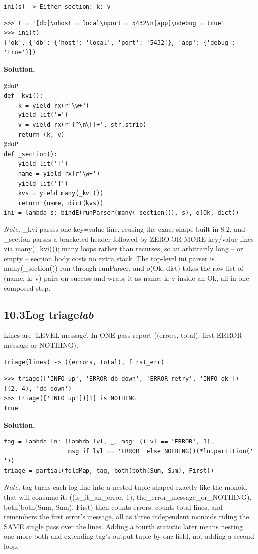 \documentclass[10pt,letterpaper]{book}
\begin{document}
\noindent\texttt{ini(s) -> Either {section: {k: v}}}
\begin{lstlisting}[style=ex]
>>> t = '[db]\nhost = local\nport = 5432\n[app]\ndebug = true'
>>> ini(t)
('ok', {'db': {'host': 'local', 'port': '5432'}, 'app': {'debug': 'true'}})
\end{lstlisting}
\noindent\textbf{Solution.}
\begin{lstlisting}[style=code]
@doP
def _kvi():
    k = yield rx(r'\w+')
    yield lit('=')
    v = yield rx(r'[^\n\[]+', str.strip)
    return (k, v)
@doP
def _section():
    yield lit('[')
    name = yield rx(r'\w+')
    yield lit(']')
    kvs = yield many(_kvi())
    return (name, dict(kvs))
ini = lambda s: bindE(runParser(many(_section()), s), o(Ok, dict))
\end{lstlisting}
\noindent\textit{Note.} \_kvi parses one key=value line, reusing the exact shape built in 8.2, and \_section parses a bracketed header followed by ZERO OR MORE key/value lines via many(\_kvi()); many loops rather than recurses, so an arbitrarily long -- or empty -- section body costs no extra stack. The top-level ini parser is many(\_section()) run through runParser, and o(Ok, dict) takes the raw list of (name, {k: v}) pairs on success and wraps it as {name: {k: v}} inside an Ok, all in one composed step.

\subsection*{10.3\quad Log triage\hfill\textnormal{\textit{lab}}}
Lines are 'LEVEL message'. In ONE pass report ((errors, total), first ERROR message or NOTHING).

\noindent\texttt{triage(lines) -> ((errors, total), first\_err)}
\begin{lstlisting}[style=ex]
>>> triage(['INFO up', 'ERROR db down', 'ERROR retry', 'INFO ok'])
((2, 4), 'db down')
>>> triage(['INFO up'])[1] is NOTHING
True
\end{lstlisting}
\noindent\textbf{Solution.}
\begin{lstlisting}[style=code]
tag = lambda ln: (lambda lvl, _, msg: ((lvl == 'ERROR', 1),
                  msg if lvl == 'ERROR' else NOTHING))(*ln.partition(' '))
triage = partial(foldMap, tag, both(both(Sum, Sum), First))
\end{lstlisting}
\noindent\textit{Note.} tag turns each log line into a nested tuple shaped exactly like the monoid that will consume it: ((is\_it\_an\_error, 1), the\_error\_message\_or\_NOTHING). both(both(Sum, Sum), First) then counts errors, counts total lines, and remembers the first error's message, all as three independent monoids riding the SAME single pass over the lines. Adding a fourth statistic later means nesting one more both and extending tag's output tuple by one field, not adding a second loop.
\end{document}
